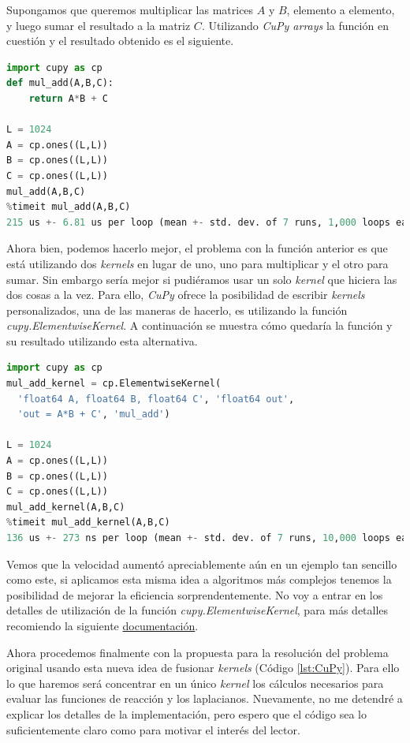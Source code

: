 Supongamos que queremos multiplicar las matrices $A$ y $B$, elemento a elemento, y luego sumar el resultado a la matriz $C$. Utilizando 
\textit{CuPy arrays} la función en cuestión y el resultado obtenido es el siguiente.

\begin{lstlisting}[language=Python,label = {lst:sum_add}]
import cupy as cp
def mul_add(A,B,C):
    return A*B + C

L = 1024
A = cp.ones((L,L))
B = cp.ones((L,L))
C = cp.ones((L,L))
mul_add(A,B,C)
%timeit mul_add(A,B,C)
215 us +- 6.81 us per loop (mean +- std. dev. of 7 runs, 1,000 loops each)
\end{lstlisting}

Ahora bien, podemos hacerlo mejor, el problema con la función anterior es que está utilizando dos \textit{kernels} en lugar de uno, uno para multiplicar 
y el otro para sumar. Sin embargo sería mejor si pudiéramos usar un solo \textit{kernel} que hiciera las dos cosas a la vez. Para ello, \textit{CuPy} 
ofrece la posibilidad de escribir \textit{kernels} personalizados, una de las maneras de hacerlo, es utilizando la función \textit{cupy.ElementwiseKernel}.
A continuación se muestra cómo quedaría la función y su resultado utilizando esta alternativa.

\begin{lstlisting}[language=Python,label = {lst:sum_add_kernel}]
import cupy as cp
mul_add_kernel = cp.ElementwiseKernel(
  'float64 A, float64 B, float64 C', 'float64 out',
  'out = A*B + C', 'mul_add')
  
L = 1024
A = cp.ones((L,L))
B = cp.ones((L,L))
C = cp.ones((L,L))
mul_add_kernel(A,B,C)
%timeit mul_add_kernel(A,B,C)
136 us +- 273 ns per loop (mean +- std. dev. of 7 runs, 10,000 loops each)
\end{lstlisting}
Vemos que la velocidad aumentó apreciablemente aún en un ejemplo tan sencillo como este, si aplicamos esta misma idea a algoritmos más 
complejos tenemos la posibilidad de mejorar la eficiencia sorprendentemente. No voy a entrar en los detalles de utilización de la función 
\textit{cupy.ElementwiseKernel}, para más detalles recomiendo la siguiente \href{https://docs.cupy.dev/en/stable/user_guide/kernel.html}{documentación}.

Ahora procedemos finalmente con la propuesta para la resolución del problema original usando esta nueva idea de fusionar \textit{kernels} 
(Código \ref{lst:CuPy}). Para ello lo que haremos será concentrar en un único \textit{kernel} los cálculos necesarios para evaluar las funciones 
de reacción y los laplacianos. Nuevamente, no me detendré a explicar los detalles de la implementación, pero espero que el código sea lo suficientemente
claro como para motivar el interés del lector.

